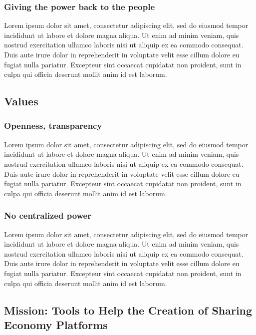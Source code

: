 \documentclass[a4paper]{article}
\begin{document}
\subsubsection{Giving the power back to the people}

Lorem ipsum dolor sit amet, consectetur adipiscing elit, sed do eiusmod tempor incididunt ut labore et dolore magna aliqua. Ut enim ad minim veniam, quis nostrud exercitation ullamco laboris nisi ut aliquip ex ea commodo consequat. Duis aute irure dolor in reprehenderit in voluptate velit esse cillum dolore eu fugiat nulla pariatur. Excepteur sint occaecat cupidatat non proident, sunt in culpa qui officia deserunt mollit anim id est laborum.

\subsection{Values}

\subsubsection{Openness, transparency}

Lorem ipsum dolor sit amet, consectetur adipiscing elit, sed do eiusmod tempor incididunt ut labore et dolore magna aliqua. Ut enim ad minim veniam, quis nostrud exercitation ullamco laboris nisi ut aliquip ex ea commodo consequat. Duis aute irure dolor in reprehenderit in voluptate velit esse cillum dolore eu fugiat nulla pariatur. Excepteur sint occaecat cupidatat non proident, sunt in culpa qui officia deserunt mollit anim id est laborum.

\subsubsection{No centralized power}

Lorem ipsum dolor sit amet, consectetur adipiscing elit, sed do eiusmod tempor incididunt ut labore et dolore magna aliqua. Ut enim ad minim veniam, quis nostrud exercitation ullamco laboris nisi ut aliquip ex ea commodo consequat. Duis aute irure dolor in reprehenderit in voluptate velit esse cillum dolore eu fugiat nulla pariatur. Excepteur sint occaecat cupidatat non proident, sunt in culpa qui officia deserunt mollit anim id est laborum.

\subsection{Mission: Tools to Help the Creation of Sharing Economy Platforms}
\end{document}
